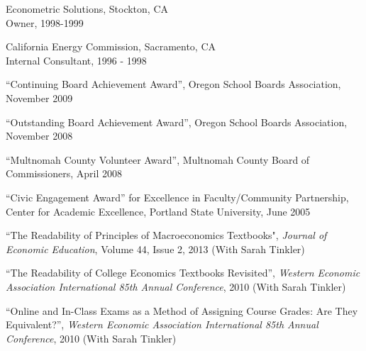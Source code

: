 \documentclass[Computer Science]{vita}
\begin{document}
\begin{vita}
\begin{Experience}
  \item Econometric Solutions, Stockton, CA\\
    Owner, 1998-1999
		
  \item California Energy Commission, Sacramento, CA\\
    Internal Consultant, 1996 - 1998
	
 
  \end{Experience}

  \begin{Honors}

  \item ``Continuing Board Achievement Award'', Oregon School Boards Association, November 2009

\item ``Outstanding Board Achievement Award'', Oregon School Boards Association, November 2008

\item ``Multnomah County Volunteer Award'', Multnomah County Board of Commissioners, April 2008

  \item ``Civic Engagement Award'' for Excellence in Faculty/Community
    Partnership, Center for Academic Excellence, Portland State
    University, June 2005

  \end{Honors}


  \begin{Publications}

  
    \begin{Selected Papers in Refereed Journals}
    
    \item ``The Readability of Principles of Macroeconomics Textbooks", \emph{Journal of Economic Education}, Volume 44, Issue 2, 2013 (With Sarah Tinkler) 
  
    \end{Selected Papers in Refereed Journals}


    \begin{Selected Papers at Refereed Conferences}
    
    \item ``The Readability of College Economics Textbooks Revisited'', \emph{Western Economic Association International
        85th Annual Conference}, 2010 (With Sarah Tinkler)

    \item ``Online and In-Class Exams as a Method of Assigning Course Grades: 
Are They Equivalent?'', \emph{Western Economic Association International
        85th Annual Conference}, 2010 (With Sarah Tinkler)


\end{Selected Papers at Refereed Conferences}
\end{Publications}
\end{vita}
\end{document}
